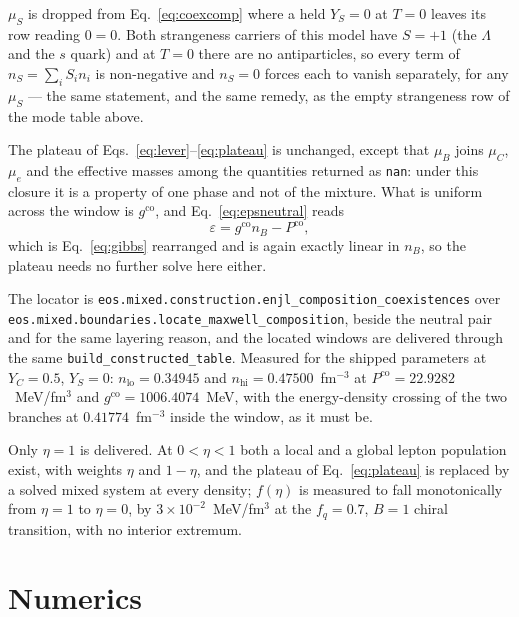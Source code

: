 \documentclass[aps,prc,onecolumn,superscriptaddress,nofootinbib,10pt]{revtex4-2}
\newcommand{\nB}{n_B}
\newcommand{\nS}{n_S}
\newcommand{\muB}{\mu_B}
\newcommand{\muC}{\mu_C}
\newcommand{\muS}{\mu_S}
\begin{document}
$\muS$ is dropped from Eq.~\eqref{eq:coexcomp} where a held $Y_S = 0$ at
$T = 0$ leaves its row reading $0 = 0$. Both strangeness carriers of this model
have $S = +1$ (the $\Lambda$ and the $s$ quark) and at $T = 0$ there are no
antiparticles, so every term of $\nS = \sum_i S_i n_i$ is non-negative and
$\nS = 0$ forces each to vanish separately, for any $\muS$ --- the same
statement, and the same remedy, as the empty strangeness row of the mode table
above.

The plateau of Eqs.~\eqref{eq:lever}--\eqref{eq:plateau} is unchanged, except
that $\muB$ joins $\muC$, $\mu_e$ and the effective masses among the quantities
returned as \texttt{nan}: under this closure it is a property of one phase and
not of the mixture. What is uniform across the window is $g^{\text{co}}$, and
Eq.~\eqref{eq:epsneutral} reads
\begin{equation}
  \varepsilon = g^{\text{co}} \nB - P^{\text{co}},
  \label{eq:epscomp}
\end{equation}
which is Eq.~\eqref{eq:gibbs} rearranged and is again exactly linear in $\nB$,
so the plateau needs no further solve here either.

The locator is
\texttt{eos.mixed.construction.enjl\_composition\_coexistences} over
\texttt{eos.mixed.boundaries.locate\_maxwell\_composition}, beside the neutral
pair and for the same layering reason, and the located windows are delivered
through the same \texttt{build\_constructed\_table}. Measured for the shipped
parameters at $Y_C = 0.5$, $Y_S = 0$: $n_{\text{lo}} = 0.34945$ and
$n_{\text{hi}} = 0.47500$~fm$^{-3}$ at $P^{\text{co}} = 22.9282$~MeV/fm$^3$ and
$g^{\text{co}} = 1006.4074$~MeV, with the energy-density crossing of the two
branches at $0.41774$~fm$^{-3}$ inside the window, as it must be.

Only $\eta = 1$ is delivered. At $0 < \eta < 1$ both a local and a global
lepton population exist, with weights $\eta$ and $1 - \eta$, and the plateau of
Eq.~\eqref{eq:plateau} is replaced by a solved mixed system at every density;
$f(\eta)$ is measured to fall monotonically from $\eta = 1$ to $\eta = 0$, by
$3 \times 10^{-2}$~MeV/fm$^3$ at the $f_q = 0.7$, $B = 1$ chiral transition,
with no interior extremum.

\section{Numerics}
\label{sec:numerics}
\end{document}
